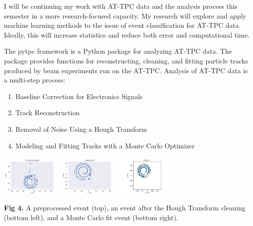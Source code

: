 \documentclass[ansiepaper,portrait]{baposter}
\begin{document}
\begin{poster}
{{I will be continuing my work with AT-TPC data and the analysis process this semester in a more research-focused capacity. My research will explore and apply machine learning methods to the issue of event classification for AT-TPC data. Ideally, this will increase statistics and reduce both error and computational time. }
}
{\small{The pytpc framework is a Python package for analyzing AT-TPC data. The package provides functions for reconstructing, cleaning, and fitting particle tracks produced by beam experiments run on the AT-TPC. Analysis of AT-TPC data is a multi-step process:

\begin{enumerate}\itemsep-0.04em
\item Baseline Correction for Electronics Signals
\item Track Reconstruction
\item Removal of Noise Using a Hough Transform
\item Modeling and Fitting Tracks with a Monte Carlo Optimizer
\end{enumerate}

\begin{center}
\includegraphics [width=30mm] {preprocess_evt.pdf}
\hspace{3cm}
\includegraphics [width=30mm] {clean_evt.pdf}
\hspace{0cm}
\includegraphics [width=30mm] {fit_evt.pdf}
\end{center}
\textbf{Fig 4.} A preprocessed event (top), an event after the Hough Transform cleaning (bottom left), and a Monte Carlo fit event (bottom right).}
} 


\end{poster}
\end{document}
